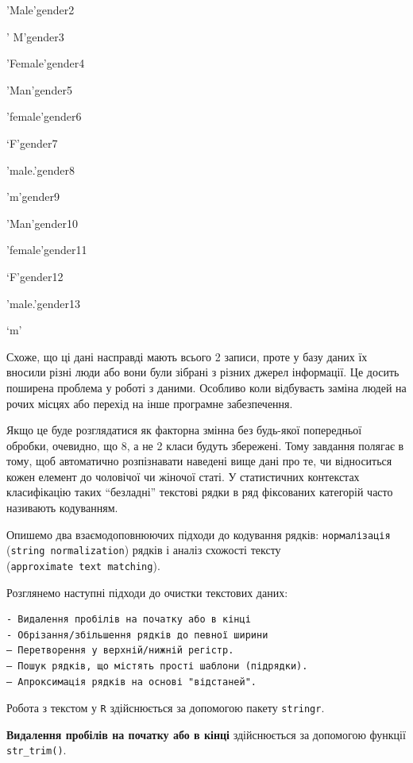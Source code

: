 \documentclass[
  letterpaper,
  DIV=11,
  numbers=noendperiod]{scrreprt}
\providecommand{\tightlist}{%
  \setlength{\itemsep}{0pt}\setlength{\parskip}{0pt}}\usepackage{longtable,booktabs,array}
\begin{document}
\begin{description}
\tightlist
\item[gender1]
'Male'gender2

{' M'}gender3

'Female'gender4

'Man'gender5

'female'gender6

{`F'}gender7

'male.'gender8

'm'gender9

'Man'gender10

'female'gender11

{`F'}gender12

'male.'gender13

`m'
\end{description}

Схоже, що ці дані насправді мають всього 2 записи, проте у базу даних їх
вносили різні люди або вони були зібрані з різних джерел інформації. Це
досить поширена проблема у роботі з даними. Особливо коли відбуваєть
заміна людей на рочих місцях або перехід на інше програмне забезпечення.

Якщо це буде розглядатися як факторна змінна без будь-якої попередньої
обробки, очевидно, що 8, а не 2 класи будуть збережені. Тому завдання
полягає в тому, щоб автоматично розпізнавати наведені вище дані про те,
чи відноситься кожен елемент до чоловічої чи жіночої статі. У
статистичних контекстах класифікацію таких ``безладні'' текстові рядки в
ряд фіксованих категорій часто називають кодуванням.

Опишемо два взаємодоповнюючих підходи до кодування рядків:
\texttt{нормалізація} (\texttt{string\ normalization}) рядків і аналіз
схожості тексту (\texttt{approximate\ text\ matching}).

Розглянемо наступні підходи до очистки текстових даних:

\begin{verbatim}
- Видалення пробілів на початку або в кінці
- Обрізання/збільшення рядків до певної ширини
– Перетворення у верхній/нижній регістр.
– Пошук рядків, що містять прості шаблони (підрядки).
– Апроксимація рядків на основі "відстаней".
\end{verbatim}

Робота з текстом у \texttt{R} здійснюється за допомогою пакету
\texttt{stringr}.

\textbf{Видалення пробілів на початку або в кінці} здійснюється за
допомогою функції \texttt{str\_trim()}.
\end{document}
